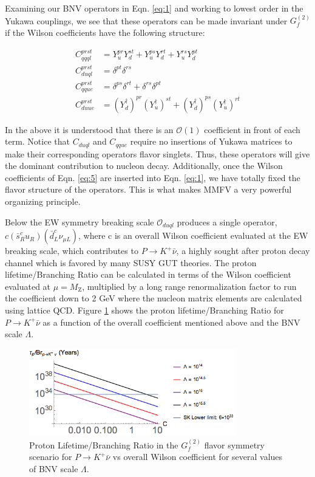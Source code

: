 \documentclass[aps,twocolumn,twoside,secnumarabic,balancelastpage,amsmath,amssymb,nofootinbib,hyperref=pdftex]{revtex4}
\begin{document}
Examining our BNV operators in Eqn. \ref{eq:1} and working to lowest order in the Yukawa couplings, we see that these operators can be made invariant under $G^{(2)}_{f}$ if the Wilson coefficients have the following structure:

\begin{equation} \label{eq:5}
 \begin{aligned}
 C^{prst}_{qqql} &= Y^{pr}_{u}Y^{st}_{d} + Y^{ps}_{u}Y^{rt}_{d} + Y^{rs}_{u}Y^{pt}_{d}\\
 C^{prst}_{duql} &= \delta^{pt}\delta^{rs}\\
 C^{prst}_{qque} &= \delta^{ps}\delta^{rt} + \delta^{rs}\delta^{pt}\\
 C^{prst}_{duue} &= (Y^{\dagger}_{d})^{pr}(Y^{\dagger}_{u})^{st} + (Y^{\dagger}_{d})^{ps}(Y^{\dagger}_{u})^{rt}
 \end{aligned}
\end{equation}

In the above it is understood that there is an $\mathcal{O}(1)$ coefficient in front of each term. Notice that $C_{duql}$ and $C_{qque}$ require no insertions of Yukawa matrices to make their corresponding operators flavor singlets. Thus, these operators will give the dominant contribution to nucleon decay. Additionally, once the Wilson coefficients of Eqn. \ref{eq:5} are inserted into Eqn. \ref{eq:1}, we have totally fixed the flavor structure of the operators. This is what makes MMFV a very powerful organizing principle.

Below the EW symmetry breaking scale $\mathcal{O}_{duql}$ produces a single operator, $c(\bar{s}^{c}_{R}u_{R})(\bar{d}^{c}_{L}\nu_{\mu L})$, where c is an overall Wilson coefficient evaluated at the EW breaking scale, which contributes to $P\rightarrow K^{+}\bar{\nu}$, a highly sought after proton decay channel which is favored by many SUSY GUT theories. The proton lifetime/Branching Ratio can be calculated in terms of the Wilson coefficient evaluated at $\mu = M_{\text{Z}}$, multiplied by a long range renormalization factor to run the coefficient down to 2 GeV where the nucleon matrix elements are calculated using lattice QCD\cite{lattice}. Figure \ref{fig:1} shows the proton lifetime/Branching Ratio for $P\rightarrow K^{+}\bar{\nu}$ as a function of the overall coefficient mentioned above and the BNV scale $\Lambda$. 

\begin{figure}[htbp]
\begin{center}
\includegraphics[width=9cm]{fig1.png}
\caption{Proton Lifetime/Branching Ratio in the $G^{(2)}_{f}$ flavor symmetry scenario for $P\rightarrow K^{+}\bar{\nu}$  vs overall Wilson coefficient for several values of BNV scale $\Lambda$.}
\label{fig:1}
\end{center}
\end{figure}
\end{document}
